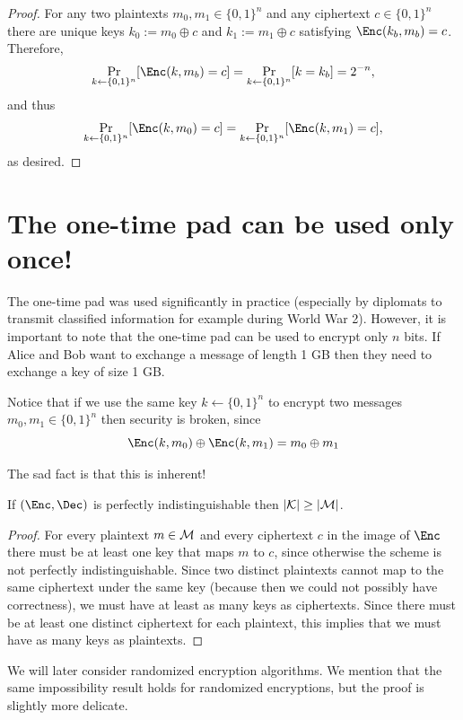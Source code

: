 \begin{proof}
    For any two plaintexts $m_0,m_1 \in\{0,1\}^n$  and any ciphertext $c\in\{0,1\}^n$ there are unique keys $k_0 := m_0 \oplus c$ and $k_1 := m_1 \oplus c$ satisfying 
    $\Enc(k_b,m_b) = c$. Therefore,
    \[
    \Pr_{k\gets\{0,1\}^n}[\Enc(k,m_b)=c]=\Pr_{k\gets\{0,1\}^n}[k=k_b]=2^{-n},
    \]
and thus 
\[
\Pr_{k\gets\{0,1\}^n}[\Enc(k,m_0)=c]=\Pr_{k\gets\{0,1\}^n}[\Enc(k,m_1)=c],
\]
as desired.
\end{proof}

\section{The one-time pad can be used only once!}

The one-time pad was used significantly in practice (especially by diplomats to transmit classified information for example during World War 2).   However, it is important to note that the one-time pad can be used to encrypt only $n$ bits. If Alice and Bob want to exchange a message of length 1 GB then they need to exchange a key of size 1 GB. 

Notice that if we use the same key $k\gets \{0,1\}^n$ to encrypt two messages $m_0,m_1\in\{0,1\}^n$ then security is broken, since 
\[
\Enc(k,m_0)\oplus\Enc(k,m_1)= m_0\oplus m_1
\]

The sad fact is that this is inherent!

\begin{theorem}
    If $(\Enc,\Dec)$ is perfectly indistinguishable then $|{\cal K}|\geq |{\cal M}|$.
\end{theorem}

\begin{proof}
    For every plaintext $m\in{\cal M}$ and every ciphertext $c$ in the image of $\Enc$ there must be at least one key that maps $m$ to $c$, since otherwise the scheme is not perfectly indistinguishable. Since two distinct plaintexts cannot map to the same ciphertext under the same key (because then we could not possibly have correctness), we must have at least as many keys as ciphertexts. Since there must be at least one distinct ciphertext for each plaintext, this implies that we must have as many keys as plaintexts.
    \end{proof}

    \begin{remark}
        We will later consider randomized encryption algorithms.  We mention that the same impossibility result holds for randomized encryptions, but the proof is slightly more delicate.  
    \end{remark}

